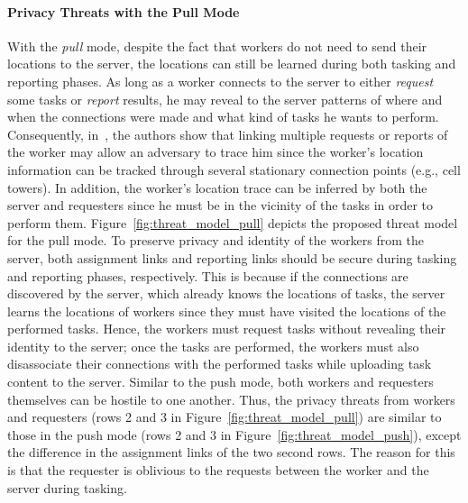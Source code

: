 \documentclass{USC-Thesis}
\numberwithin{equation}{chapter}
\begin{document}
\paragraph{\textbf{Privacy Threats with the Pull Mode}}

With the \emph{pull} mode, despite the fact that workers do not need to send their locations to the server, the locations can still be learned during both tasking and reporting phases. As long as a worker connects to the server to either \emph{request} some tasks or \emph{report} results, he may reveal to the server patterns of where and when the connections were made and what kind of tasks he wants to perform. Consequently, in~\cite{Shin2011}, the authors show that linking multiple requests or reports of the worker may allow an adversary to trace him since the worker's location information can be tracked through several stationary connection points (e.g., cell towers). In addition, the worker's location trace can be inferred by both the server and requesters since he must be in the vicinity of the tasks in order to perform them.
Figure~\ref{fig:threat_model_pull} depicts the proposed threat model for the pull mode. To preserve privacy and identity of the workers from the server, both assignment links and reporting links should be secure during tasking and reporting phases, respectively. This is because if the connections are discovered by the server, which already knows the locations of tasks, the server learns the locations of workers since they must have visited the locations of the performed tasks. Hence, the workers must request tasks without revealing their identity to the server; once the tasks are performed, the workers must also disassociate their connections with the performed tasks while uploading task content to the server.
Similar to the push mode, both workers and requesters themselves can be hostile to one another.
Thus, the privacy threats from workers and requesters (rows 2 and 3 in Figure~\ref{fig:threat_model_pull}) are similar to those in the push mode (rows 2 and 3 in Figure~\ref{fig:threat_model_push}), except the difference in the assignment links of the two second rows. The reason for this is that the requester is oblivious to the requests between the worker and the server during tasking.


\end{document}
